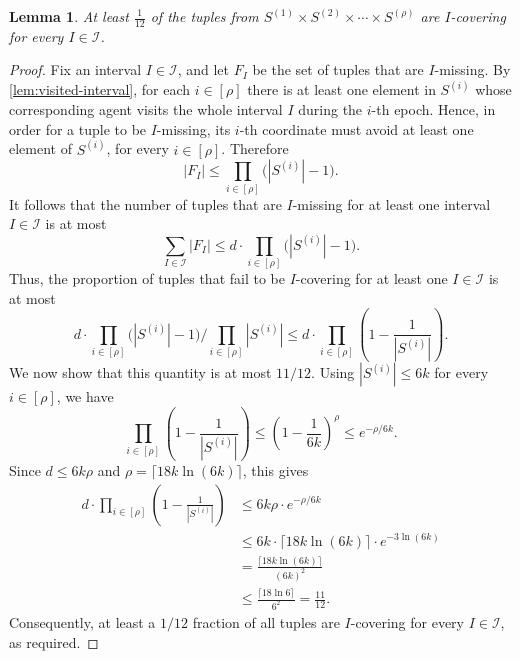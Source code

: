 \documentclass[a4paper,11pt]{article}
\newtheorem{lemma}[theorem]{Lemma}
\theoremstyle{definition}
\theoremstyle{remark}
\newcommand{\bfI}{\ensuremath{\mathcal{I}}}
\begin{document}
\begin{lemma}\label{lem:I-covering}
   At least $\frac{1}{12}$ of the tuples from $S^{(1)} \times S^{(2)} \times \cdots \times S^{(\rho)}$ are $I$-covering for every $I \in \bfI$.
\end{lemma}
\begin{proof}
    Fix an interval $I \in \bfI$, and let $F_I$ be the set of tuples that are
    $I$-missing. By \cref{lem:visited-interval}, for each $i \in [\rho]$ there is
    at least one element in $S^{(i)}$ whose corresponding agent visits the whole
    interval $I$ during the $i$-th epoch. Hence, in order for a tuple to be
    $I$-missing, its $i$-th coordinate must avoid at least one element of
    $S^{(i)}$, for every $i \in [\rho]$. Therefore
    \[
        |F_I|
        \leq
        \prod_{i \in [\rho]} \bigl(|S^{(i)}|-1\bigr).
    \]
    It follows that the number of tuples that are $I$-missing
    for at least one interval $I \in \bfI$ is at most
    \[
        \sum_{I \in \bfI} |F_I|
        \leq
        d \cdot \prod_{i \in [\rho]} \bigl(|S^{(i)}|-1\bigr).
    \]
    Thus, the proportion of tuples that fail to be $I$-covering for at least one
    $I \in \bfI$ is at most
    \[
        d \cdot \prod_{i \in [\rho]} \bigl(|S^{(i)}|-1\bigr)
        \Big/
        \prod_{i \in [\rho]} |S^{(i)}|
    \leq
        d \cdot
        \prod_{i \in [\rho]}
        \left(1-\frac{1}{|S^{(i)}|}\right).
    \]
    We now show that this quantity is at most $11/12$. Using
    $|S^{(i)}| \leq 6k$ for every $i \in [\rho]$, we have
    \[
        \prod_{i \in [\rho]}
        \left(1-\frac{1}{|S^{(i)}|}\right)
        \leq
        \left(1-\frac{1}{6k}\right)^\rho
        \leq
        e^{-\rho/6k}.
    \]
    Since $d \leq 6k\rho$ and $\rho=\lceil 18k \ln(6k)\rceil$, this gives
    \begin{align*}
        d \cdot
        \prod_{i \in [\rho]}
        \left(1-\frac{1}{|S^{(i)}|}\right)
        &\leq
        6k\rho \cdot e^{-\rho/6k} \\
        &\leq
        6k \cdot \lceil 18k \ln(6k)\rceil
        \cdot e^{-3\ln(6k)} \\
        &=
        \frac{\lceil 18k \ln(6k)\rceil}{(6k)^2} \\
        &\leq
        \frac{\lceil 18\ln 6\rceil}{6^2}
        =
        \frac{11}{12}.
    \end{align*}
    Consequently, at least a $1/12$ fraction of all tuples are $I$-covering for every $I \in \bfI$, as required.
\end{proof}
\end{document}
